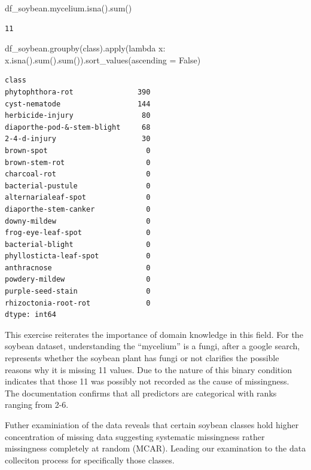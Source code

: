 \documentclass[
  11pt,
]{article}
\newenvironment{Shaded}{\begin{snugshade}}{\end{snugshade}}
\newcommand{\BuiltInTok}[1]{\textcolor[rgb]{0.00,0.23,0.31}{#1}}
\newcommand{\KeywordTok}[1]{\textcolor[rgb]{0.00,0.23,0.31}{#1}}
\newcommand{\NormalTok}[1]{\textcolor[rgb]{0.00,0.23,0.31}{#1}}
\newcommand{\OperatorTok}[1]{\textcolor[rgb]{0.37,0.37,0.37}{#1}}
\newcommand{\StringTok}[1]{\textcolor[rgb]{0.13,0.47,0.30}{#1}}
\newcommand{\VariableTok}[1]{\textcolor[rgb]{0.07,0.07,0.07}{#1}}
\begin{document}
\begin{Shaded}
\begin{Highlighting}[]
\NormalTok{df\_soybean.mycelium.isna().}\BuiltInTok{sum}\NormalTok{()}
\end{Highlighting}
\end{Shaded}

\begin{verbatim}
11
\end{verbatim}

\begin{Shaded}
\begin{Highlighting}[]
\NormalTok{df\_soybean.groupby(}\StringTok{\textquotesingle{}class\textquotesingle{}}\NormalTok{).}\BuiltInTok{apply}\NormalTok{(}\KeywordTok{lambda}\NormalTok{ x: x.isna().}\BuiltInTok{sum}\NormalTok{().}\BuiltInTok{sum}\NormalTok{()).sort\_values(ascending }\OperatorTok{=} \VariableTok{False}\NormalTok{)}
\end{Highlighting}
\end{Shaded}

\begin{verbatim}
class
phytophthora-rot               390
cyst-nematode                  144
herbicide-injury                80
diaporthe-pod-&-stem-blight     68
2-4-d-injury                    30
brown-spot                       0
brown-stem-rot                   0
charcoal-rot                     0
bacterial-pustule                0
alternarialeaf-spot              0
diaporthe-stem-canker            0
downy-mildew                     0
frog-eye-leaf-spot               0
bacterial-blight                 0
phyllosticta-leaf-spot           0
anthracnose                      0
powdery-mildew                   0
purple-seed-stain                0
rhizoctonia-root-rot             0
dtype: int64
\end{verbatim}

This exercise reiterates the importance of domain knowledge in this
field. For the soybean dataset, understanding the ``mycelium'' is a
fungi, after a google search, represents whether the soybean plant has
fungi or not clarifies the possible reasons why it is missing 11 values.
Due to the nature of this binary condition indicates that those 11 was
possibly not recorded as the cause of missingness. The documentation
confirms that all predictors are categorical with ranks ranging from
2-6.

Futher examiniation of the data reveals that certain soybean classes
hold higher concentration of missing data suggesting systematic
missingness rather missingness completely at random (MCAR). Leading our
examination to the data colleciton process for specifically those
classes.
\end{document}
